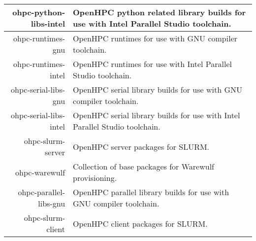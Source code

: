\begin{tabularx}{\textwidth}{r|X}
\hline
ohpc-python-libs-intel & OpenHPC python related library builds for use with Intel Parallel Studio toolchain. \\ 
\hline
ohpc-runtimes-gnu & OpenHPC runtimes for use with GNU compiler toolchain. \\ 
\hline
ohpc-runtimes-intel & OpenHPC runtimes for use with Intel Parallel Studio toolchain. \\ 
\hline
ohpc-serial-libs-gnu & OpenHPC serial library builds for use with GNU compiler toolchain. \\ 
\hline
ohpc-serial-libs-intel & OpenHPC serial library builds for use with Intel Parallel Studio toolchain. \\ 
\hline
ohpc-slurm-server & OpenHPC server packages for SLURM. \\ 
\hline
ohpc-warewulf & Collection of base packages for Warewulf provisioning. \\ 
\hline
ohpc-parallel-libs-gnu & OpenHPC parallel library builds for use with GNU compiler toolchain. \\ 
\hline
ohpc-slurm-client & OpenHPC client packages for SLURM. \\ 
\hline
\bottomrule
\end{tabularx}
